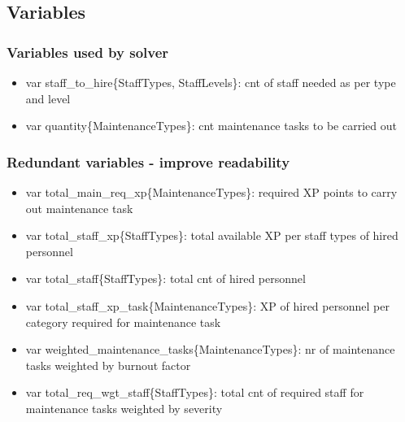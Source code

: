     \subsection{Variables}
      \subsubsection{Variables used by solver}
        \begin{itemize}
          \item var staff\_to\_hire\{StaffTypes, StaffLevels\}: cnt of staff needed as per type and level
          \item var quantity\{MaintenanceTypes\}: cnt maintenance tasks to be carried out
        \end{itemize}

      \subsubsection{Redundant variables - improve readability}
        \begin{itemize}
          \item var total\_main\_req\_xp\{MaintenanceTypes\}: required XP points to carry out maintenance task
          \item var total\_staff\_xp\{StaffTypes\}: total available XP per staff types of hired personnel
          \item var total\_staff\{StaffTypes\}: total cnt of hired personnel
          \item var total\_staff\_xp\_task\{MaintenanceTypes\}: XP of hired personnel per category required for maintenance task
          \item var weighted\_maintenance\_tasks\{MaintenanceTypes\}: nr of maintenance tasks weighted by burnout factor
          \item var total\_req\_wgt\_staff\{StaffTypes\}: total cnt of required staff for maintenance tasks weighted by severity
        \end{itemize}
        
